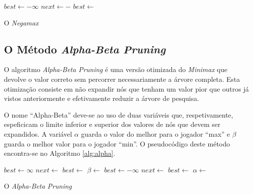 \documentclass[12pt,a4paper,oneside]{article}
\begin{document}
\begin{algorithm}
\begin{algorithmic}
 
   
  \EndIf
  \State $best \gets -\infty$
      \State $next \gets -$
      \State $best \gets$ 
  \EndFor
  \State{} 
\EndFunction
\end{algorithmic}
\caption{O \textit{Negamax}}
\label{alg:nega}
\end{algorithm}

\subsection{O Método \textit{Alpha-Beta Pruning}}

O algoritmo \emph{Alpha-Beta Pruning} é uma versão otimizada do
\textit{Minimax} que devolve o valor correto sem percorrer
necessariamente a árvore completa. Esta otimização consiste em não
expandir nós que tenham um valor pior que outros já vistos
anteriormente e efetivamente reduzir a árvore de pesquisa.

O nome ``Alpha-Beta'' deve-se ao uso de duas variáveis que,
respetivamente, espeficicam o limite inferior e superior dos valores
de nós que devem ser expandidos\cite{Russell:AI:2003}. A variável
$\alpha$ guarda o valor do melhor para o jogador ``max'' e $\beta$
guarda o melhor valor para o jogador ``min''. O pseudocódigo deste
método encontra-se no Algoritmo \ref{alg:alpha}.

\begin{algorithm}
\begin{algorithmic}
   
  \EndIf
      \State $best \gets \infty$
          \State $next \gets$ 
          \State $best \gets$ 
              \State{}
          \EndIf
          \State $\beta \gets$ 
      \EndFor
      \State $best \gets -\infty$
          \State $next \gets$ 
          \State $best \gets$ 
              \State{}
          \EndIf
          \State $\alpha \gets$ 
      \EndFor
  \EndIf
  \State{} 
\EndFunction
\end{algorithmic}
\caption{O \emph{Alpha-Beta Pruning}}
\label{alg:alpha}
\end{algorithm}
\end{document}
